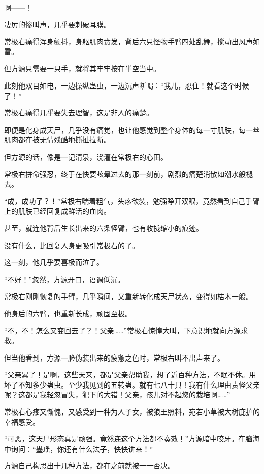 
\begin{this_body}

啊——！

凄厉的惨叫声，几乎要刺破耳膜。

常极右痛得浑身颤抖，身躯肌肉贲发，背后六只怪物手臂四处乱舞，搅动出风声如雷。

但方源只需要一只手，就将其牢牢按在半空当中。

此刻他双目如电，一边操纵蛊虫，一边沉声断喝：“我儿，忍住！就看这个时候了！”

常极右痛得几乎要失去理智，这是非人的痛楚。

即便是化身成天尸，几乎没有痛觉，也让他感觉到整个身体的每一寸肌肤，每一丝肌肉都在被无情残酷地撕扯拉断。

但方源的话，像是一记清泉，浇灌在常极右的心田。

常极右拼命强忍，终于在快要眩晕过去的那一刻前，剧烈的痛楚消散如潮水般褪去。

“成，成功了？！”常极右喘着粗气，头疼欲裂，勉强睁开双眼，竟然看到自己手臂上的肌肤已经回复成鲜活的血肉。

甚至，就连他背后生长出来的六条怪臂，也有收拢缩小的痕迹。

没有什么，比回复人身更吸引常极右的了。

这一刻，他几乎要喜极而泣了。

“不好！”忽然，方源开口，语调低沉。

常极右刚刚恢复的手臂，几乎瞬间，又重新转化成天尸状态，变得如枯木一般。

他身后的六臂，也重新长成，顽固至极。

“不，不！怎么又变回去了？！父亲……”常极右惊惶大叫，下意识地就向方源求救。

但当他看到，方源一脸伪装出来的疲惫之色时，常极右叫不出声来了。

“父亲累了！是啊，这些天来，都是父亲帮助我，想了近百种方法，不眠不休。用坏了不知多少蛊虫。至少我见到的五转蛊。就有七八十只！我有什么理由责怪父亲呢？这都是我轻忽冒失，犯下的大错！父亲，孩儿对不起您的栽培啊……”

常极右心疼又惭愧，又感受到一种为人子女，被狼王照料，宛若小草被大树庇护的幸福感受。

“可恶，这天尸形态真是顽强。竟然连这个方法都不奏效！”方源暗中咬牙。在脑海中询问：“墨瑶，你还有什么法子，快快讲来！”

方源自己构思出十几种方法，都在之前就被一一否决。


\end{this_body}
